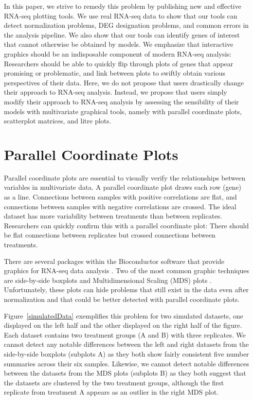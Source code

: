 \documentclass[11pt,a4paper,oldfontcommands,openany]{memoir}
\numberwithin{equation}{section} %
\begin{document}
In this paper, we strive to remedy this problem by publishing new and effective RNA-seq plotting tools. We use real RNA-seq data to show that our tools can detect normalization problems, DEG designation problems, and common errors in the analysis pipeline. We also show that our tools can identify genes of interest that cannot otherwise be obtained by models. We emphasize that interactive graphics should be an indisposable component of modern RNA-seq analysis: Researchers should be able to quickly flip through plots of genes that appear promising or problematic, and link between plots to swiftly obtain various perspectives of their data. Here, we do not propose that users drastically change their approach to RNA-seq analysis. Instead, we propose that users simply modify their approach to RNA-seq analysis by assessing the sensibility of their models with multivariate graphical tools, namely with parallel coordinate plots, scatterplot matrices, and litre plots.

\section{Parallel Coordinate Plots}

Parallel coordinate plots are essential to visually verify the relationships between variables in multivariate data. A parallel coordinate plot draws each row (gene) as a line. Connections between samples with positive correlations are flat, and connections between samples with negative correlations are crossed. The ideal dataset has more variability between treatments than between replicates. Researchers can quickly confirm this with a parallel coordinate plot: There should be flat connections between replicates but crossed connections between treatments.

There are several packages within the Bioconductor software that provide graphics for RNA-seq data analysis \citep{Huber}. Two of the most common graphic techniques are side-by-side boxplots and Multidimensional Scaling (MDS) plots \citep{Love, Risso, Robinson, Ritchie}. Unfortunately, these plots can hide problems that still exist in the data even after normalization and that could be better detected with parallel coordinate plots.

Figure~\ref{simulatedData} exemplifies this problem for two simulated datasets, one displayed on the left half and the other displayed on the right half of the figure. Each dataset contains two treatment groups (A and B) with three replicates. We cannot detect any notable differences between the left and right datasets from the side-by-side boxplots (subplots A) as they both show fairly consistent five number summaries across their six samples. Likewise, we cannot detect notable differences between the datasets from the MDS plots (subplots B) as they both suggest that the datasets are clustered by the two treatment groups, although the first replicate from treatment A appears as an outlier in the right MDS plot.
\end{document}

